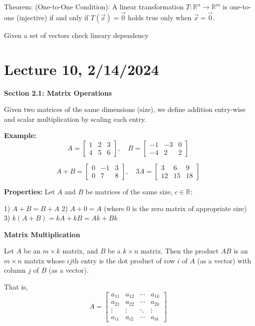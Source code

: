 \documentclass{article}
\begin{document}
Theorem: (One-to-One Condition): A linear transformation $T: \mathbb{R}^n \to \mathbb{R}^m$ is one-to-one (injective) if and only if $T(\vec{x}) = \vec{0}$ holds true only when $\vec{x} = \vec{0}$.

Given a set of vectors check lineary dependency





\section{Lecture 10, 2/14/2024}

\textbf{Section 2.1: Matrix Operations}

Given two matrices of the same dimensions (size), we define addition entry-wise and scalar multiplication by scaling each entry.

\textbf{Example:}
\[ A = \begin{bmatrix} 1 & 2 & 3 \\ 4 & 5 & 6 \end{bmatrix}, \quad B = \begin{bmatrix} -1 & -3 & 0 \\ -4 & 2 & 2 \end{bmatrix} \]

\[ A + B = \begin{bmatrix} 0 & -1 & 3 \\ 0 & 7 & 8 \end{bmatrix}, \quad 3A = \begin{bmatrix} 3 & 6 & 9 \\ 12 & 15 & 18 \end{bmatrix} \]

\textbf{Properties:} Let \( A \) and \( B \) be matrices of the same size, \( c \in \mathbb{R} \):

1) \( A + B = B + A \)
2) \( A + 0 = A \) (where \( 0 \) is the zero matrix of appropriate size)
3) \( k(A + B) = kA + kB = Ak + Bk \)

\textbf{Matrix Multiplication}

Let \( A \) be an \( m \times k \) matrix, and \( B \) be a \( k \times n \) matrix. Then the product \( AB \) is an \( m \times n \) matrix whose \( ij \)th entry is the dot product of row \( i \) of \( A \) (as a vector) with column \( j \) of \( B \) (as a vector).

That is,
\[ A = \begin{bmatrix} a_{11} & a_{12} & \cdots & a_{1k} \\ a_{21} & a_{22} & \cdots & a_{2k} \\ \vdots & \vdots & \ddots & \vdots \\ a_{i1} & a_{i2} & \cdots & a_{ik} \end{bmatrix} \]
\end{document}
